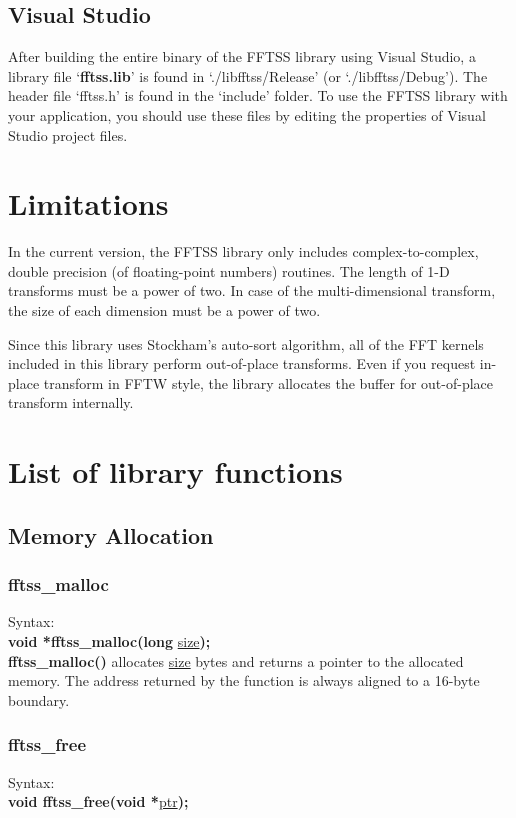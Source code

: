 \documentclass{article}
\begin{document}
\subsection{Visual Studio}
After building the entire binary of the FFTSS library using Visual Studio,
 a library file `{\bf fftss.lib}' is found in 
`./libfftss/Release'
 (or `./libfftss/Debug').
 The header file `fftss.h' is found in the `include' folder.
To use the FFTSS library with your application,
you should use these files by editing the properties of 
Visual Studio project files.

\section{Limitations}

In the current version, the FFTSS library only includes complex-to-complex,
 double precision (of floating-point numbers) routines.
The length of 1-D transforms must be a power of two.
In case of the multi-dimensional transform,
 the size of each dimension must be a power of two.

Since this library uses Stockham's auto-sort algorithm,
all of the FFT kernels included in this library perform
out-of-place transforms. Even if you request in-place transform
in FFTW style, the library allocates the buffer for out-of-place 
transform internally. 


\section{List of library functions}
\subsection{Memory Allocation}
\subsubsection{fftss\_malloc}
Syntax:\\
{\bf void *fftss\_malloc(long }\underline{size}{\bf );}\\

{\bf fftss\_malloc()} allocates \underline{size} bytes and returns a pointer to
the allocated memory. The address returned by the function is always 
aligned to a 16-byte boundary.

\subsubsection{fftss\_free}
Syntax:\\
{\bf void fftss\_free(void *}\underline{ptr}{\bf );}\\
\end{document}
